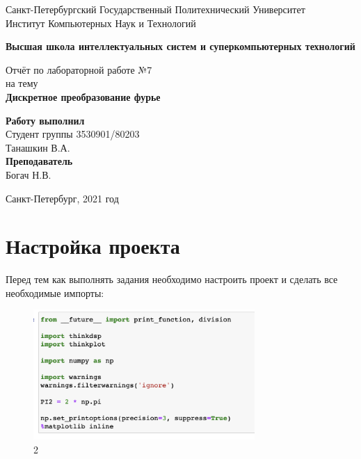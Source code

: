 \documentclass[10pt,a4paper,oneside]{article}
\begin{document}
\begin{titlepage}
\newpage
	\begin{center}
		\Large Санкт-Петербургский Государственный Политехнический Университет\\
		Институт Компьютерных Наук и Технологий\\
	\end{center}
	\begin{center}
		\large\textbf {Высшая школа интеллектуальных систем и суперкомпьютерных технологий}
	\end{center}
	
	\vspace{5em}
	\begin{center}
		\large{Отчёт по лабораторной работе №7 \\ на тему \\
		\textbf{Дискретное преобразование фурье} }
	\end{center}
	
	\vspace{25em}
	\begin{flushright}
		\textbf{Работу выполнил\\}Студент группы 3530901/80203 \\ Танашкин В.А.\\
		\textbf{Преподаватель\\}Богач Н.В. 
	\end{flushright}
	
	\vspace{\fill}%
	\begin{center}
	Санкт-Петербург, 2021 год	
	\end{center}
\end{titlepage} %

\section{Настройка проекта}
Перед тем как выполнять задания необходимо настроить проект и сделать все необходимые импорты:

\begin{figure}[H]
        \centering
        \includegraphics[width=0.75\textwidth]{pics/0.png}
        \caption{2}
        \label{fig:first}
\end{figure}
\end{document}

